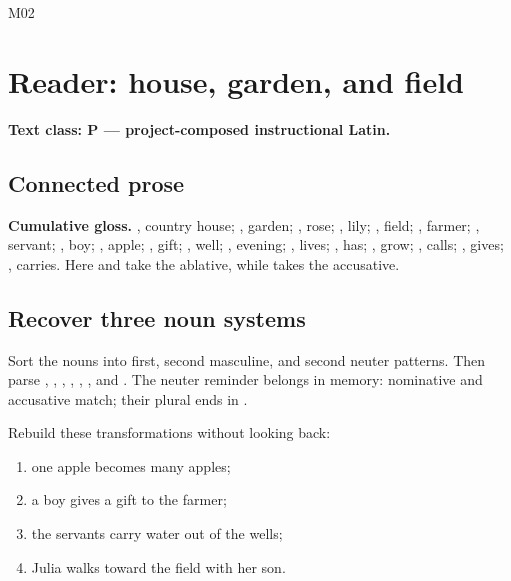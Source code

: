 \begin{courseunit}{M02}
\chapter{Reader: house, garden, and field}

\textbf{Text class: P --- project-composed instructional Latin.}

\section{Connected prose}


\textbf{Cumulative gloss.} , country house; , garden;
, rose; , lily; , field;
, farmer; , servant; , boy;
, apple; , gift; , well;
, evening; , lives; , has;
, grow; , calls; , gives;
, carries.  Here  and  take the ablative,
while  takes the accusative.

\section{Recover three noun systems}

Sort the nouns into first, second masculine, and second neuter patterns.  Then
parse , , , ,
, , and .  The neuter reminder belongs
in memory: nominative and accusative match; their plural ends in .

Rebuild these transformations without looking back:

\begin{enumerate}
\item one apple becomes many apples;
\item a boy gives a gift to the farmer;
\item the servants carry water out of the wells;
\item Julia walks toward the field with her son.
\end{enumerate}


\end{courseunit}
